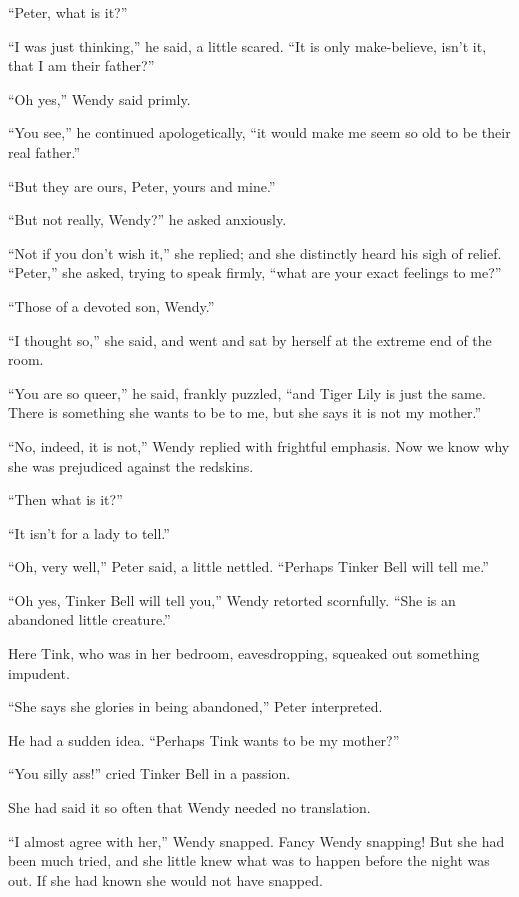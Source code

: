 “Peter, what is it?”

“I was just thinking,” he said, a little scared.
“It is only make-believe, isn’t it, that I am their father?”

“Oh yes,” Wendy said primly.

“You see,” he continued apologetically,
“it would make me seem so old to be their real father.”

“But they are ours, Peter, yours and mine.”

“But not really, Wendy?\@” he asked anxiously.

“Not if you don’t wish it,” she replied;
and she distinctly heard his sigh of relief.
“Peter,” she asked, trying to speak firmly,
“what are your exact feelings to me?”

“Those of a devoted son, Wendy.”

“I thought so,” she said,
and went and sat by herself at the extreme end of the room.

“You are so queer,” he said, frankly puzzled, “and Tiger Lily is just the same.
There is something she wants to be to me, but she says it is not my mother.”

“No, indeed, it is not,” Wendy replied with frightful emphasis.
Now we know why she was prejudiced against the redskins.

“Then what is it?”

“It isn’t for a lady to tell.”

“Oh, very well,” Peter said, a little nettled.
“Perhaps Tinker Bell will tell me.”

“Oh yes, Tinker Bell will tell you,” Wendy retorted scornfully.
“She is an abandoned little creature.”

Here Tink, who was in her bedroom, eavesdropping,
squeaked out something impudent.

“She says she glories in being abandoned,” Peter interpreted.

He had a sudden idea.
“Perhaps Tink wants to be my mother?”

“You silly ass!\@” cried Tinker Bell in a passion.

She had said it so often that Wendy needed no translation.

“I almost agree with her,” Wendy snapped.
Fancy Wendy snapping!
But she had been much tried,
and she little knew what was to happen before the night was out.
If she had known she would not have snapped.


